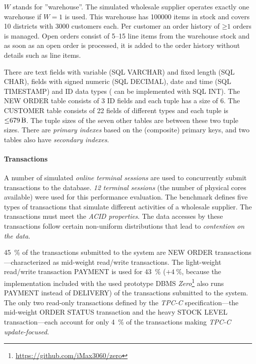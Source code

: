     $W$ stands for ''warehouse''. The simulated wholesale supplier operates exactly one warehouse if $W = 1$ is used. This warehouse has \num{100000} items in stock and covers \num{10} districts with \num{3000} customers each. Per customer an order history of $\mathord{\geq}1$ orders is managed. Open orders consist of \numrange{5}{15} line items from the warehouse stock and as soon as an open order is processed, it is added to the order history without details such as line items.

    There are text fields with variable (SQL VARCHAR) and fixed length (SQL CHAR), fields with signed numeric (SQL DECIMAL), date and time (SQL TIMESTAMP) and ID data types ( can be implemented with SQL INT). The NEW ORDER table consists of 3 ID fields and each tuple has a size of \SI{6}{\byte}. The CUSTOMER table consists of 22 fields of different types and each tuple is $\mathord{\leq}\SI{679}{\byte}$. The tuple sizes of the seven other tables are between these two tuple sizes. There are \emph{primary indexes} based on the (composite) primary keys, and two tables also have \emph{secondary indexes}.

\paragraph{Transactions}

    A number of simulated \emph{online terminal sessions} are used to concurrently submit transactions to the database. \emph{12 terminal sessions} (the number of physical cores available) were used for this performance evaluation. The benchmark defines five types of transactions that simulate different activities of a wholesale supplier. The transactions must meet the \emph{ACID properties}. The data accesses by these transactions follow certain non-uniform distributions that lead to \emph{contention on the data}.

    \SI{45}{\percent} of the transactions submitted to the system are NEW ORDER transactions---characterized as mid-weight read/write transactions. The light-weight read/write transaction PAYMENT is used for \SI{43}{\percent} ($\mathord{+}\SI{4}{\percent}$, because the implementation included with the used prototype DBMS \textit{Zero}\footnote{\url{https://github.com/iMax3060/zero}} also runs PAYMENT instead of DELIVERY) of the transactions submitted to the system. The only two read-only transactions defined by the \textit{TPC-C} specification---the mid-weight ORDER STATUS transaction and the heavy STOCK LEVEL transaction---each account for only \SI{4}{\percent} of the transactions making \textit{TPC-C} \emph{update-focused}.

